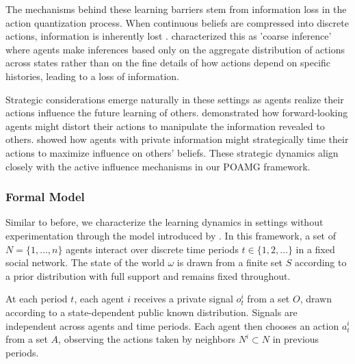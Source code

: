 The mechanisms behind these learning barriers stem from information loss in the action quantization process. When continuous beliefs are compressed into discrete actions, information is inherently lost \citep{smith2000pathological}. \citet{guarino2013social} characterized this as 'coarse inference' where agents make inferences based only on the aggregate distribution of actions across states rather than on the fine details of how actions depend on specific histories, leading to a loss of information.

\iffalse
Recent work has examined how behavioral factors and network structure interact to shape learning outcomes. \citet{molavi2018theory} developed models of "rational inattention" where agents optimally allocate limited cognitive resources to process social information. \citet{dasaratha2020learning} showed how certain network structures can amplify or mitigate the effects of confirmation bias and other cognitive distortions. \citet{jadbabaie2012non} proposed hybrid learning models that combine Bayesian updating with naive opinion averaging, better matching empirical patterns of social influence.
\fi

Strategic considerations emerge naturally in these settings as agents realize their actions influence the future learning of others. \citet{bhattacharya2013strategic} demonstrated how forward-looking agents might distort their actions to manipulate the information revealed to others. \citet{ARIELI2019185} showed how agents with private information might strategically time their actions to maximize influence on others' beliefs. These strategic dynamics align closely with the active influence mechanisms in our POAMG framework.

\subsubsection{Formal Model}
Similar to before, we characterize the learning dynamics in settings without experimentation through the model introduced by \citet{brandl2024}. In this framework, a set of $N= \{1, \ldots, n\}$ agents interact over discrete time periods $t \in \{1, 2, \ldots\}$ in a fixed social network. The state of the world $\omega$ is drawn from a finite set $S$ according to a prior distribution with full support and remains fixed throughout.

At each period $t$, each agent $i$ receives a private signal $o^i_t$ from a set $O$, drawn according to a state-dependent public known distribution. Signals are independent across agents and time periods. Each agent then chooses an action $a^i_t$ from a set $A$, observing the actions taken by neighbors $N^i \subset N$ in previous periods.

